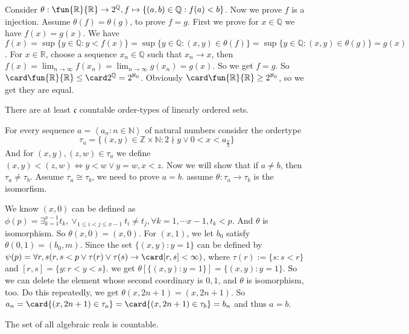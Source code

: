 \documentclass{ctexart}
\begin{document}
\begin{solution}
  Consider \(\theta:\fun{\mathbb{R}}{\mathbb{R}} \to 2^{\mathbb{Q}}, f \mapsto \{(a,b) \in \mathbb{Q}: f(a) < b\}\). 
  Now we prove \(f\) is a injection. 
  Assume \(\theta(f)=\theta(g)\), to prove \(f=g\). 
  First we prove for \(x\in \mathbb{Q}\) we have \(f(x)=g(x)\). 
  We have \(f(x)=\sup \{y \in \mathbb{Q}:y<f(x)\}=\sup\{y \in \mathbb{Q}:(x,y) \in \theta(f)\}=\sup\{y \in \mathbb{Q} : (x,y) \in \theta (g)\}=g(x)\).
  For \(x \in \mathbb{R}\), choose a sequence \(x_n \in \mathbb{Q}\) such that \(x_n \to x\), 
  then \(f(x)= \lim_{n \to \infty }f(x_n)=\lim_{n \to \infty }g(x_n)=g(x)\). 
  So we get \(f=g\). So \(\card \fun{\mathbb{R}}{\mathbb{R}} \leq \card 2^{\mathbb{Q}}=2^{\aleph_0}\).
  Obviously \(\card\fun{\mathbb{R}}{\mathbb{R}} \geq 2^{\aleph_0}\), so we get they are equal. 
\end{solution}
\begin{problem}
There are at least $\mathfrak{c}$ countable order-types of linearly ordered sets.
\end{problem}

\begin{solution}
For every sequence $a=\left\langle a_n: n \in \mathbb{N}\right\rangle$ of natural numbers consider the ordertype
$$
\tau_a=\{(x,y) \in \mathbb{Z}\times \mathbb{N}:2 \nmid y \vee 0<x<a_{\frac{y}{2}}\}
$$
And for \((x,y),(z,w) \in \tau_a\) we define \((x,y)<(z,w) \iff y<w \vee y=w,x<z\).
Now we will show that if $a \neq b$, then $\tau_a \neq \tau_b$. 
Assume \(\tau_a \cong \tau_b\), we need to prove \(a=b\). assume \(\theta:\tau_a \to \tau_b\) is the isomorfism. 

We know \((x,0)\) can be defined as \(\phi(p)=\exists_{k=1}^{x-1} t_k,\vee_{1 \leq i < j \leq x-1}t_i \neq t_j, \forall k=1,\cdots x-1, t_k<p\). 
And \(\theta\) is isomorphism. So \(\theta(x,0)=(x,0)\). 
For \((x,1)\), we let \(b_0\) satisfy \(\theta(0,1)=(b_0,m)\). 
Since the set \(\{(x,y):y=1\}\) can be defined by \(\psi(p)=\forall r,s(r,s<p \vee \tau(r)\vee \tau(s) \to \card[r,s] < \infty )\), 
where \(\tau(r):= \{s:s<r\}\) and \([r,s]=\{y:r<y<s\}\). 
we get \(\theta[\{(x,y):y=1\}]=\{(x,y):y=1\}\). 
So we can delete the element whose second coordinary is \(0,1\), and \(\theta\) is isomorphism, too. 
Do this repeatedly, we get \(\theta(x,2n+1)=(x,2n+1)\). 
So \(a_n=\card\{(x,2n+1)\in \tau_a\}=\card \{(x,2n+1) \in \tau_b\}=b_n\) and thus \(a=b\).
\end{solution}
\begin{problem}
The set of all algebraic reals is countable.
\end{problem}
\end{document}
